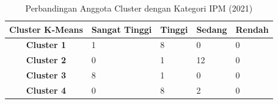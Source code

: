 \begin{table}[H]
\centering
\caption{Perbandingan Anggota Cluster dengan Kategori IPM (2021)} \label{tab:ipm_cross_2021}
\begin{tabular}{|c|p{2cm}|p{2cm}|p{2cm}|p{2cm}|}
\hline
\textbf{Cluster K-Means} & \textbf{Sangat Tinggi} & \textbf{Tinggi} & \textbf{Sedang} & \textbf{Rendah} \\ \hline
\textbf{Cluster 1} & 1 & 8 & 0 & 0 \\ \hline
\textbf{Cluster 2} & 0 & 1 & 12 & 0 \\ \hline
\textbf{Cluster 3} & 8 & 1 & 0 & 0 \\ \hline
\textbf{Cluster 4} & 0 & 8 & 2 & 0 \\ \hline
\end{tabular}
\end{table}